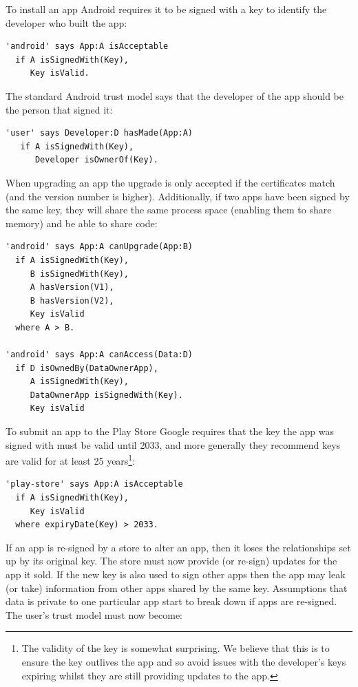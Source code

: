 \documentclass[thesis.tex]{subfiles}
\begin{document}
To install an app Android requires it to be signed with a key to
identify the developer who built the app:

\noindent\begin{minipage}{\textwidth}
\begin{lstlisting}
'android' says App:A isAcceptable
  if A isSignedWith(Key),
     Key isValid.
\end{lstlisting}
\end{minipage}

The standard Android trust model says that the developer of the app should be the person that signed it:

\begin{lstlisting}
'user' says Developer:D hasMade(App:A)
   if A isSignedWith(Key),
      Developer isOwnerOf(Key).
\end{lstlisting}

When upgrading an app the upgrade is only accepted if the certificates match
(and the version number is higher). Additionally, if two apps have been signed by
the same key, they will share the same process space (enabling them to share
memory) and be able to share code:

\begin{lstlisting}
'android' says App:A canUpgrade(App:B)
  if A isSignedWith(Key),
     B isSignedWith(Key),
     A hasVersion(V1),
     B hasVersion(V2),
     Key isValid
  where A > B.
  
'android' says App:A canAccess(Data:D)
  if D isOwnedBy(DataOwnerApp),
     A isSignedWith(Key),
     DataOwnerApp isSignedWith(Key).
     Key isValid
\end{lstlisting}

To submit an app to the Play Store Google requires that the key the
app was signed with must be valid until 2033, and more generally they
recommend keys are valid for at least 25 years\footnote{The validity of the key is somewhat surprising.  We believe that this is to ensure the key outlives the app and so avoid issues with the developer's keys expiring whilst they are still  providing updates to the app.}:

\begin{lstlisting}
'play-store' says App:A isAcceptable
  if A isSignedWith(Key),
     Key isValid
  where expiryDate(Key) > 2033.
\end{lstlisting}

If an app is re-signed by a store to alter an app, then it loses the
relationships set up by its original key. The store must now provide (or
re-sign) updates for the app it sold.
If the new key is also used to sign other apps then the app
may leak (or take) information from other apps shared by the same key.
Assumptions that data is private to one particular app start to break down if
apps are re-signed.  The user's trust model must now become:
\end{document}
